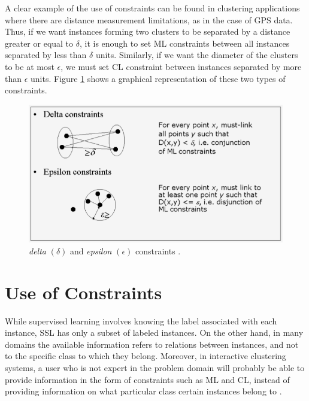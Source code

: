 A clear example of the use of constraints can be found in clustering applications where there are distance measurement limitations, as in the case of \acs{GPS} data. Thus, if we want instances forming two clusters to be separated by a distance greater or equal to $\delta$, it is enough to set \acs{ML} constraints between all instances separated by less than $\delta$ units. Similarly, if we want the diameter of the clusters to be at most $\epsilon$, we must set \acs{CL} constraint between instances separated by more than $\epsilon$ units. Figure \ref{fig:DistanceConstraints} shows a graphical representation of these two types of constraints.

\begin{figure}[!h]
	\centering
	\includegraphics[scale=0.45]{gfx/ConstClust/RestriccionesDeltaEpsilon.png} 
	\caption[\textit{delta} $(\delta)$ and \textit{epsilon} $(\epsilon)$ constraints.]{\textit{delta} $(\delta)$ and \textit{epsilon} $(\epsilon)$ constraints \cite{davidson2007survey}.}\label{fig:DistanceConstraints}
\end{figure}


\section{Use of Constraints} \label{sec:ConstUse}

While supervised learning involves knowing the label associated with each instance, \acs{SSL} has only a subset of labeled instances. On the other hand, in many domains the available information refers to relations between instances, and not to the specific class to which they belong. Moreover, in interactive clustering systems, a user who is not expert in the problem domain will probably be able to provide information in the form of constraints such as \acs{ML} and \acs{CL}, instead of providing information on what particular class certain instances belong to \cite{cohn2003semi,davidson2007hierarchical}.


